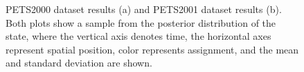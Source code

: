 \documentclass[smallcondensed, final]{svjour3}
\begin{document}
\begin{figure}[h]
  \centering
   \hspace{1mm}           
  \caption{PETS2000 dataset results (a) and PETS2001 dataset results (b). Both plots show a sample from the posterior distribution of the state, where the vertical axis denotes time, the horizontal axes represent spatial position, color represents assignment, and the mean and standard deviation are shown.}
  \label{fig:benchmark_results_1}
\end{figure}
\end{document}
